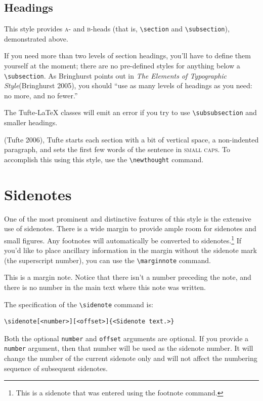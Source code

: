 \documentclass[
  twoside,
  symmetric]{tufte-book}
\newcommand{\TL}{Tufte-\LaTeX\xspace}
\begin{document}
\subsection{Headings}\label{sec:headings}

This style provides \textsc{a}- and \textsc{b}-heads (that is,
\texttt{\textbackslash{}section} and
\texttt{\textbackslash{}subsection}), demonstrated above.

If you need more than two levels of section headings, you'll have to
define them yourself at the moment; there are no pre-defined styles for
anything below a \texttt{\textbackslash{}subsection}. As Bringhurst
points out in \emph{The Elements of Typographic Style}(Bringhurst 2005),
you should ``use as many levels of headings as you need: no more, and no
fewer.''

The \TL classes will emit an error if you try to use
\texttt{\textbackslash{}subsubsection} and smaller headings.

(Tufte 2006), Tufte starts each section
with a bit of vertical space, a non-indented paragraph, and sets the
first few words of the sentence in \textsc{small caps}. To accomplish
this using this style, use the \texttt{\textbackslash{}newthought}
command.

\section{Sidenotes}\label{sec:sidenotes}

One of the most prominent and distinctive features of this style is the
extensive use of sidenotes. There is a wide margin to provide ample room
for sidenotes and small figures. Any footnotes will automatically be
converted to sidenotes.\footnote{This is a sidenote that was entered
  using the footnote command.} If you'd like to place ancillary
information in the margin without the sidenote mark (the superscript
number), you can use the \texttt{\textbackslash{}marginnote} command.

This is a margin note. Notice that there isn't a number preceding the
note, and there is no number in the main text where this note was
written.

The specification of the \texttt{\textbackslash{}sidenote} command is:

\begin{verbatim}
\sidenote[<number>][<offset>]{<Sidenote text.>}
\end{verbatim}

Both the optional \texttt{number} and \texttt{offset} arguments are
optional. If you provide a \texttt{number} argument, then that number
will be used as the sidenote number. It will change the number of the
current sidenote only and will not affect the numbering sequence of
subsequent sidenotes.
\end{document}
